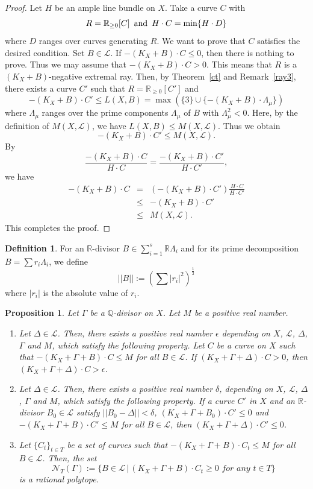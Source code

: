 \documentclass[12pt,twoside]{amsart}
\newtheorem{prop}[thm]{Proposition}
\theoremstyle{definition}
\newtheorem{dfn}[thm]{Definition}
\begin{document}
\begin{proof}
Let $H$ be an ample line bundle on $X$. 
Take a curve $C$ with 
$$R=\mathbb{R}_{\geq 0}[C]\,\,\,{\rm and}\,\,\,H\cdot C=\min\{H\cdot D\}$$
where $D$ ranges over curves generating $R$. 
We want to prove that $C$ satisfies the desired condition. 
Set $B\in \mathcal{L}$. 
If $-(K_X+B)\cdot C \leq 0$, then there is nothing to prove. 
Thus we may assume that $-(K_X+B)\cdot C > 0$. 
This means that $R$ is a $(K_X+B)$-negative extremal ray. 
Then, by Theorem~\ref{ct} and Remark~\ref{ray3}, 
there exists a curve $C'$ such that 
$R=\mathbb{R}_{\geq 0}[C']$ and 
$$-(K_X+B)\cdot C' \leq L(X, B)=\max(\{3\}\cup \{-(K_X+B)\cdot \Lambda_{\mu}\})$$ 
where $\Lambda_{\mu}$ ranges over the prime components $\Lambda_{\mu}$ of $B$ with $\Lambda_{\mu}^2<0$. 
Here, by the definition of $M(X, \mathcal{L})$, we have 
$L(X, B)\leq M(X, \mathcal{L}).$ 
Thus we obtain 
$$-(K_X+B)\cdot C' \leq M(X, \mathcal{L}).$$
By 
$$\frac{-(K_X+B)\cdot C}{H\cdot C}=\frac{-(K_X+B)\cdot C'}{H\cdot C'},$$
we have 
\begin{eqnarray*}
{-(K_X+B)\cdot C}&=&(-(K_X+B)\cdot C')\frac{H\cdot C}{H\cdot C'}\\
&\leq& -(K_X+B)\cdot C'\\
&\leq& M(X, \mathcal{L}).
\end{eqnarray*}
This completes the proof.
\end{proof}

\begin{dfn}
For an $\mathbb{R}$-divisor $B\in \sum_{i=1}^s\mathbb R\Lambda_i$ and 
for its prime decomposition $B=\sum r_i\Lambda_i$, 
we define 
$$||B||:=(\sum |r_i|^2)^{\frac{1}{2}}$$
where $|r_i|$ is the absolute value of $r_i$. 
\end{dfn}

\begin{prop}\label{ratpolytope}
Let $\Gamma$ be a $\mathbb{Q}$-divisor on $X$. 
Let $M$ be a positive real number. 
\begin{enumerate}
\item{Let $\Delta\in\mathcal L$. 
Then, there exists a positive real number $\epsilon$ 
depending on $X$, $\mathcal L$, $\Delta$, $\Gamma$ and $M$, 
which satisfy the following property. 
Let $C$ be a curve on $X$ such that 
$-(K_X+\Gamma+B)\cdot C \leq M$ for 
all $B\in \mathcal{L}$. 
If $(K_X+\Gamma+\Delta)\cdot C>0$, then 
$(K_X+\Gamma+\Delta)\cdot C>\epsilon$.}
\item{Let $\Delta\in\mathcal L$. 
Then, there exists a positive real number $\delta$, 
depending on $X$, $\mathcal L$, $\Delta$, $\Gamma$ and $M$, 
which satisfy the following property. 
If a curve $C'$ in $X$ and an $\mathbb{R}$-divisor 
$B_0\in \mathcal{L}$ satisfy $||B_0-\Delta||<\delta$, 
$(K_X+\Gamma+B_0)\cdot C'\leq 0$ and 
$-(K_X+\Gamma+B)\cdot C' \leq M$ for 
all $B\in \mathcal{L}$, then 
$(K_X+\Gamma+\Delta)\cdot C'\leq 0$.} 
\item{Let $\{C_t\}_{t\in T}$ be 
a set of curves 
such that $-(K_X+\Gamma+B)\cdot C_t\leq M$ 
for all $B\in \mathcal{L}$. 
Then, 
the set 
$$\mathcal{N}_T(\Gamma):=\{B\in\mathcal{L}\,|\,
(K_X+\Gamma+B)\cdot C_t\geq 0 \,\,for\,\, any \,\,t \in T\}$$
is a rational polytope.}
\end{enumerate}
\end{prop}
\end{document}
